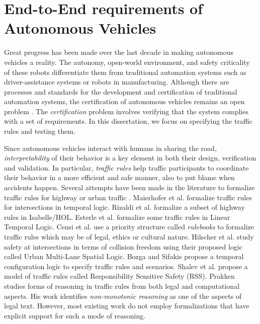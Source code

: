 \section{End-to-End requirements of Autonomous Vehicles}

Great progress has been made over the last decade in making autonomous vehicles a reality.
%
The autonomy, open-world environment, and safety criticality of these robots differentiate them from traditional automation systems such as driver-assistance systems or robots in manufacturing.
%
Although there are processes and standards for the development and certification of traditional automation systems, the certification of autonomous vehicles remains an open problem \cite{Zhao.2022}.
%
The \emph{certification} problem involves verifying that the system complies with a set of requirements.
%
%
In this dissertation, we focus on specifying the traffic rules and testing them.


Since autonomous vehicles interact with humans in sharing the road, \emph{interpretability} of their behavior is a key element in both their design, verification and validation.
%
In particular, \emph{traffic rules} help traffic participants to coordinate their behavior in a more efficient and safe manner, also to put blame when accidents happen.
%
Several attempts have been made in the literature to formalize traffic rules for highway or urban traffic \cite{Bin.2022,arechiga2019specifying,Corso.2020,Esterle.2020,Maierhofer.2020,Hekmatnejad.2019,Cho.2019,Sahin.2020,Censi.2019}.
%
Maierhofer et al. \cite{Maierhofer.2022} formalize traffic rules for intersections in temporal logic.
%
Rizaldi et al. \cite{Rizaldi.2015,Rizaldi.2017} formalize a subset of highway rules in Isabelle/HOL.
%
Esterle et al. \cite{Esterle.2019,Esterle.2020} formalize some traffic rules in Linear Temporal Logic.
%
Censi et al. \cite{Censi.2019} use a priority structure called \emph{rulebooks} to formalize traffic rules which may be of legal, ethics or cultural nature.
%
Hilscher et al. \cite{Hilscher.2016} study safety at intersections in terms of collision freedom using their proposed logic called Urban Multi-Lane Spatial Logic.
%
Bozga and Sifakis \cite{Bozga.2021} propose a temporal configuration logic to specify traffic rules and scenarios.
%
Shalev et al. \cite{Shalev.2017} propose a model of traffic rules called Responsibility Sensitive Safety (RSS).
%
Prakken \cite{Prakken.2017} studies forms of reasoning in traffic rules from both legal and computational aspects.
%
His work identifies \emph{non-monotonic reasoning} as one of the aspects of legal text.
%
However, most existing work do not employ formalizations that have explicit support for such a mode of reasoning.

